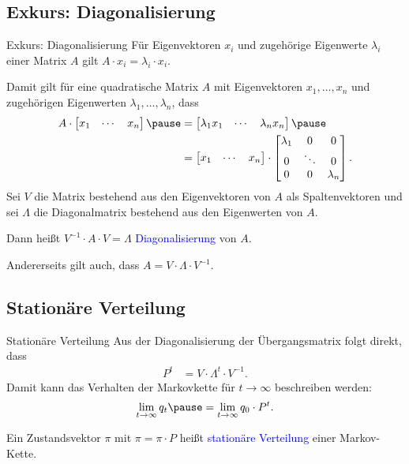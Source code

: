 \documentclass{beamer}
\def\spadding{\vspace{0.25cm}}
\def\b{\textcolor{blue}}
\begin{document}
\subsection{Exkurs: Diagonalisierung}
\begin{frame}{Exkurs: Diagonalisierung}
    Für Eigenvektoren $x_i$ und zugehörige Eigenwerte $\lambda_i$ einer Matrix $A$ gilt $A \cdot x_i = \lambda_i \cdot x_i$.\pause\par\spadding
    Damit gilt für eine quadratische Matrix $A$ mit Eigenvektoren $x_1, \dots, x_n$ und zugehörigen Eigenwerten $\lambda_1, \dots, \lambda_n$\pause, dass
    \begin{align*}
        A \cdot \begin{bmatrix}
            x_1 & \cdots & x_n
        \end{bmatrix}\pause &= \begin{bmatrix}
            \lambda_1 x_1 & \cdots & \lambda_n x_n
        \end{bmatrix}\pause \\
        &= \begin{bmatrix}
            x_1 & \cdots & x_n
        \end{bmatrix} \cdot \begin{bmatrix}
            \lambda_1 & 0 & 0 \\
            0 & \ddots & 0 \\
            0 & 0 & \lambda_n
        \end{bmatrix}.
    \end{align*}\pause
    Sei $V$ die Matrix bestehend aus den Eigenvektoren von $A$ als Spaltenvektoren und sei $\Lambda$ die Diagonalmatrix bestehend aus den Eigenwerten von $A$.\pause\par\spadding
    Dann heißt $V^{-1} \cdot A \cdot V = \Lambda$ \b{Diagonalisierung} von $A$.\pause\par
    Andererseits gilt auch, dass $A = V \cdot \Lambda \cdot V^{-1}$.
\end{frame}

\subsection{Stationäre Verteilung}
\begin{frame}{Stationäre Verteilung}
    Aus der Diagonalisierung der Übergangsmatrix folgt direkt, dass
    \begin{align*}
                                     P^t &= V \cdot \Lambda^t \cdot V^{-1}.
    \end{align*}\pause
    Damit kann das Verhalten der Markovkette für $t \to \infty$ beschreiben werden:
    \begin{align*}
        \lim_{t \to \infty} q_t\pause = \lim_{t \to \infty} q_0 \cdot P^t.
    \end{align*}\pause
    \begin{definition}
        Ein Zustandsvektor $\pi$ mit $\pi = \pi \cdot P$ heißt \b{stationäre Verteilung} einer Markov-Kette.
    \end{definition}
\end{frame}
\end{document}
